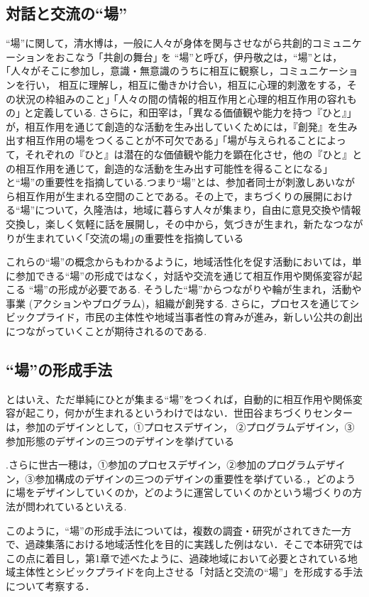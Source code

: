 \documentclass[a4paper]{jsarticle}
\begin{document}
\subsection{対話と交流の“場”}
“場”に関して，清水博は，一般に人々が身体を関与させながら共創的コミュニケーションをおこなう ｢共創の舞台｣ を “場”と呼び\cite{8}，伊丹敬之は，“場”とは，｢人々がそこに参加し，意識・無意識のうちに相互に観察し，コミュニケーションを行い， 相互に理解し，相互に働きかけ合い，相互に心理的刺激をする，その状況の枠組みのこと｣ ｢人々の間の情報的相互作用と心理的相互作用の容れもの｣ と定義している\cite{9}. さらに，和田宰は，｢異なる価値観や能力を持つ『ひと』｣ が，相互作用を通じて創造的な活動を生み出していくためには，『創発』を生み出す相互作用の場をつくることが不可欠である｣ ｢場が与えられることによって，それぞれの『ひと』は潜在的な価値観や能力を顕在化させ，他の『ひと』との相互作用を通じて，創造的な活動を生み出す可能性を得ることになる｣ と“場”の重要性を指摘している\cite{10}.つまり“場”とは、参加者同士が刺激しあいながら相互作用が生まれる空間のことである。その上で，まちづくりの展開における“場”について，久隆浩は，地域に暮らす人々が集まり，自由に意見交換や情報交換し，楽しく気軽に話を展開し，その中から，気づきが生まれ，新たなつながりが生まれていく｢交流の場｣の重要性を指摘している\cite{11}\par
これらの“場”の概念からもわかるように，地域活性化を促す活動においては，単に参加できる“場”の形成ではなく，対話や交流を通じて相互作用や関係変容が起こる “場”の形成が必要である. そうした“場”からつながりや輪が生まれ，活動や事業 (アクションやプログラム)，組織が創発する. さらに，プロセスを通じてシビックプライド，市民の主体性や地域当事者性の育みが進み，新しい公共の創出につながっていくことが期待されるのである.\par
\subsection{“場”の形成手法}
とはいえ、ただ単純にひとが集まる“場”をつくれば，自動的に相互作用や関係変容が起こり，何かが生まれるというわけではない．世田谷まちづくりセンターは，参加のデザインとして，①プロセスデザイン， ②プログラムデザイン，③参加形態のデザインの三つのデザインを挙げている\cite{12}\par.さらに世古一穂は，①参加のプロセスデザイン，②参加のプログラムデザイン，③参加構成のデザインの三つのデザインの重要性を挙げている.\cite{13}，どのように場をデザインしていくのか，どのように運営していくのかという場づくりの方法が問われているといえる.\par
このように，“場”の形成手法については，複数の調査・研究がされてきた一方で、過疎集落における地域活性化を目的に実践した例はない．そこで本研究ではこの点に着目し，第1章で述べたように、過疎地域において必要とされている地域主体性とシビックプライドを向上させる「対話と交流の“場”」を形成する手法について考察する．\par
\end{document}

